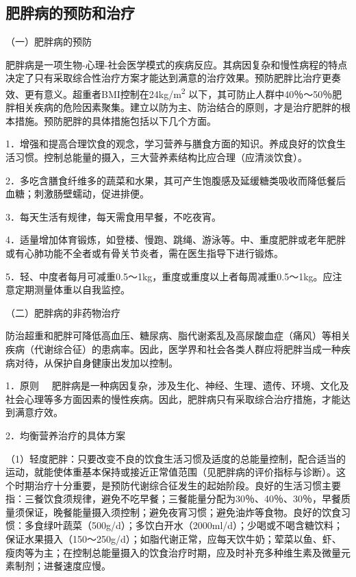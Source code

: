 \hypertarget{text00004.htmlux5cux23mllj17}{%
\subsection{肥胖病的预防和治疗}\label{text00004.htmlux5cux23mllj17}}

（一）肥胖病的预防

肥胖病是一项生物-心理-社会医学模式的疾病反应。其病因复杂和慢性病程的特点决定了只有采取综合性治疗方案才能达到满意的治疗效果。预防肥胖比治疗更奏效、更有意义。超重者BMI控制在24kg/m\textsuperscript{2}
以下，其可防止人群中40％～50％肥胖相关疾病的危险因素聚集。建立以防为主、防治结合的原则，才是治疗肥胖的根本措施。预防肥胖的具体措施包括以下几个方面。

1．增强和提高合理饮食的观念，学习营养与膳食方面的知识。养成良好的饮食生活习惯。控制总能量的摄入，三大营养素结构比应合理（应清淡饮食）。

2．多吃含膳食纤维多的蔬菜和水果，其可产生饱腹感及延缓糖类吸收而降低餐后血糖；刺激肠壁蠕动，促进排便。

3．每天生活有规律，每天需食用早餐，不吃夜宵。

4．适量增加体育锻炼，如登楼、慢跑、跳绳、游泳等。中、重度肥胖或老年肥胖或有心肺功能不全者或有骨关节炎者，需在医生指导下进行锻炼。

5．轻、中度者每月可减重0.5～1kg，重度或重度以上者每周减重0.5～1kg。应注意定期测量体重以自我监控。

（二）肥胖病的非药物治疗

防治超重和肥胖可降低高血压、糖尿病、脂代谢紊乱及高尿酸血症（痛风）等相关疾病（代谢综合征）的患病率。因此，医学界和社会各类人群应将肥胖当成一种疾病对待，从保护自身健康出发加以控制。

{1．原则}
　肥胖病是一种病因复杂，涉及生化、神经、生理、遗传、环境、文化及社会心理等多方面因素的慢性疾病。因此，肥胖病只有采取综合治疗措施，才能达到满意疗效。

{2．均衡营养治疗的具体方案}

（1）轻度肥胖：只要改变不良的饮食生活习惯及适度的总能量控制，配合适当的运动，就能使体重基本保持或接近正常值范围（见肥胖病的评价指标与诊断）。这个时期治疗十分重要，是预防代谢综合征发生的起始阶段。良好的生活习惯主要指：三餐饮食须规律，避免不吃早餐；三餐能量分配为30％、40％、30％，早餐质量须保证，晚餐能量摄入须控制；避免夜宵习惯；避免油炸等食物。良好的饮食习惯：多食绿叶蔬菜（500g/d）；多饮白开水（2000ml/d）；少喝或不喝含糖饮料；保证水果摄入（150～250g/d）；如脂代谢正常，应每天饮牛奶；荤菜以鱼、虾、瘦肉等为主；在控制总能量摄入的饮食治疗时期，应及时补充多种维生素及微量元素制剂；进餐速度应慢。

